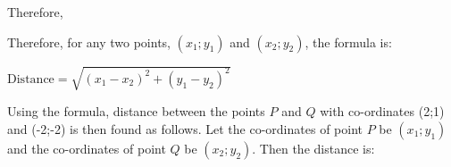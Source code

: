         \label{m39107*id67375}Therefore,\par 
        \label{m39107*id67379}\nopagebreak\noindent{}
        \label{m39107*id67499}Therefore, for any two points, $\left({x}_{1};{y}_{1}\right)$ and $\left({x}_{2};{y}_{2}\right)$, the formula is:\par 
        \label{m39107*id67561}$\mathrm{Distance}=\sqrt{{\left({x}_{1}-{x}_{2}\right)}^{2}+{\left({y}_{1}-{y}_{2}\right)}^{2}}$\par 
        \label{m39107*id67630}Using the formula, distance between the points $P$ and $Q$ with co-ordinates (2;1) and (-2;-2) is then found as follows. Let the co-ordinates of point $P$ be $\left({x}_{1};{y}_{1}\right)$ and the co-ordinates of point $Q$ be $\left({x}_{2};{y}_{2}\right)$. Then the distance is:\par 
